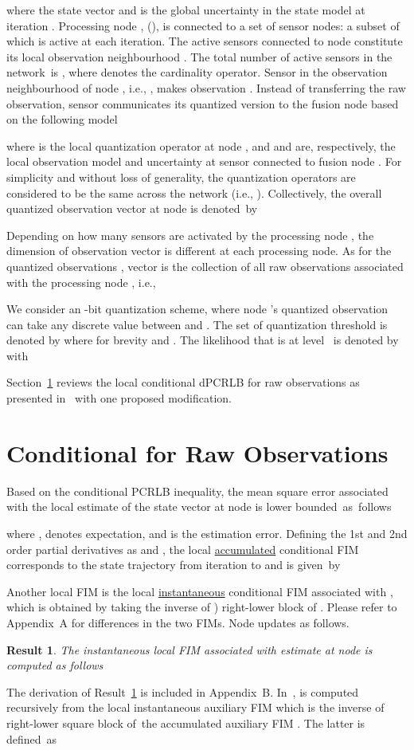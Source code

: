 \documentclass[10pt,twocolumn,twoside]{IEEEtran}
\newtheorem{rst}{Result}
\begin{document}
where the state vector  and
 is the global uncertainty in the state model at
iteration .
Processing node , (), is connected to a set of sensor nodes: a subset of which  is
 active at each iteration. The active sensors connected to node  constitute its local observation
neighbourhood . The total number of active sensors in the network~is
, where  denotes the
cardinality operator.
Sensor  in the observation neighbourhood of
node , i.e., , makes observation . Instead of
transferring the raw observation, sensor  communicates its
quantized version  to the fusion node  based on the
following model

where  is the local quantization operator at
node , and  and  are,
respectively, the local observation model and uncertainty at sensor
 connected to fusion node .  For simplicity and without loss of
generality, the quantization operators  are
considered to be the same across the network (i.e.,
).  Collectively, the overall
quantized observation vector at node  is denoted~by

Depending on how many sensors are activated by the processing node
, the dimension of observation vector  is different at
each processing node.  As for the quantized observations
, vector  is the collection of all raw
observations associated with the processing node , i.e.,

We consider an -bit quantization scheme, where
node 's quantized observation  can take any discrete value
between  and .  The set of quantization threshold is
denoted by  where for
brevity  and .
The likelihood that  is at level ~is denoted by  with

Section~\ref{sec:cpcrlb} reviews the local conditional dPCRLB for raw
observations as presented in~\cite{Arash:SPL} with one proposed
modification.
\section{Conditional  for Raw Observations} \label{sec:cpcrlb}
Based on the conditional PCRLB inequality, the mean square error
associated with the local estimate  of
the state vector at node  is lower bounded~as~follows

where ,  denotes
expectation, and  is the estimation
error.
Defining the 1st and 2nd order partial derivatives as
 and
,
the local \underline{accumulated} conditional FIM 
corresponds to the state trajectory  from iteration  to  and is given~by

Another local FIM  is the local \underline{instantaneous} conditional FIM  associated with , which is obtained by taking
the inverse of ) right-lower block of .  Please refer to
 Appendix~A for differences in the two FIMs.
Node  updates  as follows.
\begin{rst}\label{Varsh}
The instantaneous local FIM  associated with estimate
 at node  is computed as follows


\end{rst}
\noindent
The derivation of Result~\ref{Varsh} is included in Appendix~B.
In~\cite{Arash:SPL},   is computed recursively from the local instantaneous auxiliary FIM  which is the inverse of  right-lower square block of~the accumulated auxiliary FIM . The latter is defined~as
\end{document}
